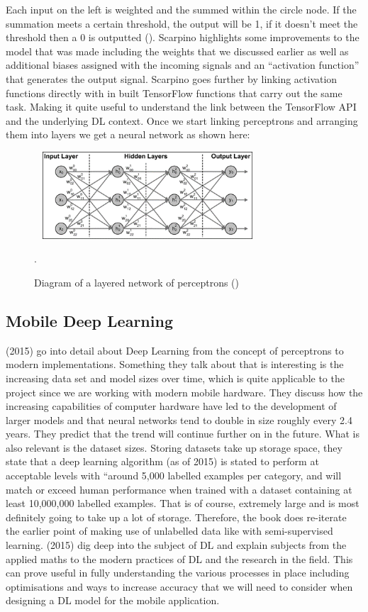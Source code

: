 \documentclass{article}
\begin{document}
\break
Each input on the left is weighted and the summed within the circle node. If the summation meets a certain threshold, 
the output will be 1, if it doesn’t meet the threshold then a 0 is outputted (\cite{ScarpinoMatthew2018Tfd}). 
Scarpino highlights some 
improvements to the model that was made including the weights that we discussed earlier as well as additional biases 
assigned with the incoming signals and an “activation function” that generates the output signal. Scarpino goes further by 
linking activation functions directly with in built TensorFlow functions that carry out the same task. Making it quite 
useful to understand the link between the TensorFlow API and the underlying DL context. Once we start linking perceptrons and arranging them 
into layers we get a neural network as shown here:
\begin{figure}[h]\
    \centering
    \includegraphics[width=0.7\textwidth]{network.png}
    \caption{Diagram of a layered network of perceptrons (\cite{ScarpinoMatthew2018Tfd})}.
\end{figure}
\subsection{Mobile Deep Learning}
\citeauthor{goodfellow2016deep} (2015) go into detail about Deep Learning from the concept of perceptrons to modern 
implementations. Something they talk about that is interesting is the increasing data set and model sizes over time, 
which is quite applicable to the project since we are working with modern mobile hardware. They discuss how the 
increasing capabilities of computer hardware have led to the development of larger models and that neural networks tend 
to double in size roughly every 2.4 years. They predict that the trend will continue further on in the future. What is 
also relevant is the dataset sizes. Storing datasets take up storage space, they state that a deep learning algorithm 
(as of 2015) is stated to perform at acceptable levels with “around 5,000 labelled examples per category, and will match
 or exceed human performance when trained with a dataset containing at least 10,000,000 labelled examples. That is of 
 course, extremely large and is most definitely going to take up a lot of storage. Therefore, the book does re-iterate 
 the earlier point of making use of unlabelled data like with semi-supervised learning. \citeauthor{goodfellow2016deep}
  (2015) dig deep into the subject of DL and explain subjects from the applied maths to the modern practices of DL and 
  the research in the field. This can prove useful in fully understanding the various processes in place including 
  optimisations and ways to increase accuracy that we will need to consider when designing a DL model for the mobile 
  application.
\end{document}
